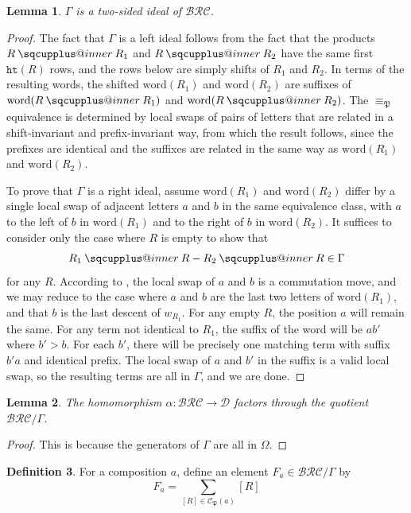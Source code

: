 \documentclass[a4paper,fleqn]{cas-sc}
\makeatletter
\newcommand{\sqcupplus@inner}[2]{%
  \vcenter{\hbox{\ooalign{%
    \hfil$\m@th#1\sqcup$\hfil\cr
    \hfil\raisebox{0.15ex}{$\m@th#1\scriptscriptstyle+$}\hfil\cr
  }}}%
}
\newcommand{\sqcupplus}{\mathbin{\mathpalette\sqcupplus@inner\relax}}
\newtheorem{lemma}{Lemma}[subsection]
\theoremstyle{definition}
\newtheorem{definition}[lemma]{Definition}
\theoremstyle{remark}
\numberwithin{equation}{subsection}
\newcommand{\wof}[1]{w_{#1}}
\newcommand{\hr}{\mathtt{ht}}
\newcommand{\BRC}{\mathcal{BRC}}
\newcommand{\dcoma}{\mathcal{D}}
\newcommand{\forest}{\mathfrak{P}}
\makeatother
\begin{document}
\begin{lemma} \label{lemma:forestideal}
  $\Gamma$ is a two-sided ideal of $\BRC$.
\end{lemma}
\begin{proof}
  The fact that $\Gamma$ is a left ideal follows from the fact that the products $R\sqcupplus R_1$ and $R\sqcupplus R_2$ have the same first $\hr(R)$ rows, and the rows below are simply shifts of $R_1$ and $R_2$. In terms of the resulting words, the shifted $\mathrm{word}(R_1)$ and $\mathrm{word}(R_2)$ are suffixes of $\mathrm{word}(R\sqcupplus R_1)$ and $\mathrm{word}(R\sqcupplus R_2)$. The $\equiv_\forest$ equivalence is determined by local swaps of pairs of letters that are related in a shift-invariant \cite[Proposition~5.8]{nadeau2024forest} and prefix-invariant \cite[Lemma~5.9]{nadeau2024forest} way, from which the result follows, since the prefixes are identical and the suffixes are related in the same way as $\mathrm{word}(R_1)$ and $\mathrm{word}(R_2)$.

  To prove that $\Gamma$ is a right ideal, assume $\mathrm{word}(R_1)$ and $\mathrm{word}(R_2)$ differ by a single local swap of adjacent letters $a$ and $b$ in the same equivalence class, with $a$ to the left of $b$ in $\mathrm{word}(R_1)$ and to the right of $b$ in $\mathrm{word}(R_2)$. It suffices to consider only the case where $R$ is empty to show that
  $$R_1\sqcupplus R - R_2\sqcupplus R\in \Gamma$$
  for any $R$. According to \cite{nadeau2024forest}, the local swap of $a$ and $b$ is a commutation move, and we may reduce to the case where $a$ and $b$ are the last two letters of $\mathrm{word}(R_1)$, and that $b$ is the last descent of $\wof{R_1}$. For any empty $R$, the position $a$ will remain the same. For any term not identical to $R_1$, the suffix of the word will be $ab'$ where $b'>b$. For each $b'$, there will be precisely one matching term with suffix $b'a$ and identical prefix. The local swap of $a$ and $b'$ in the suffix is a valid local swap, so the resulting terms are all in $\Gamma$, and we are done.
\end{proof}

\begin{lemma}
  The homomorphism $\alpha:\BRC\to\dcoma$ factors through the quotient $\BRC/\Gamma$.
\end{lemma}
\begin{proof}
This is because the generators of $\Gamma$ are all in $\Omega$.
\end{proof}

\begin{definition}
For a composition $a$, define  an element $F_a\in\BRC/\Gamma$ by
$$F_a =\sum_{[R]\in\mathcal{C}_\forest(a)} [R]$$
\end{definition}
\end{document}
